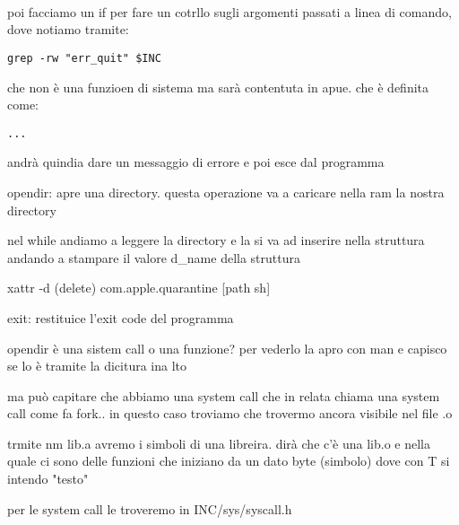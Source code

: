 \begin{lstlisting}
	
\end{lstlisting}

poi facciamo un if per fare un cotrllo sugli argomenti passati a linea di comando, dove notiamo tramite:

\begin{lstlisting}
grep -rw "err_quit" $INC
\end{lstlisting}

che non è una funzioen di sistema ma sarà contentuta in apue. che è definita come:

\begin{lstlisting}
...
\end{lstlisting}

andrà quindia dare un messaggio di errore e poi esce dal programma


opendir: apre una directory. questa operazione va a caricare nella ram la nostra directory

nel while andiamo a leggere la directory e la si va ad inserire nella struttura andando a stampare il valore d_name della struttura





xattr -d (delete) com.apple.quarantine [path sh]





exit: restituice l'exit code del programma 



opendir è una sistem call o una funzione? per vederlo la apro con man e capisco se lo è tramite la dicitura ina lto

ma può capitare che abbiamo una system call che in relata chiama una system call come fa fork.. in questo caso troviamo che trovermo ancora visibile nel file .o



trmite nm lib.a avremo i simboli di una libreira. dirà che c'è una lib.o e nella quale ci sono delle funzioni che iniziano da un dato byte (simbolo) dove con T si intendo "testo"


per le system call le troveremo in INC/sys/syscall.h